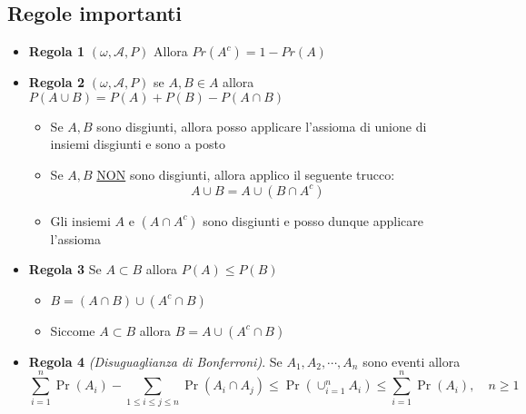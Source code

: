 \subsection{Regole importanti}
\begin{itemize}
	\item  \textbf{Regola 1} $ \left(\omega , \mathcal{A}, P\right) $ Allora $ Pr\left(A^{c}\right) = 1-Pr\left(A\right) $
	\item \textbf{Regola 2} $ \left(\omega , \mathcal{A}, P\right) $ se $ A, B \in A $ allora $ P\left(A \cup B\right) = P\left(A\right) + P\left(B\right) - P\left(A \cap B\right) $
	      \begin{itemize}
		      \item Se $ A, B $ sono disgiunti, allora posso applicare l'assioma di unione di insiemi disgiunti e sono a posto
		      \item Se $ A,B $ \underline{NON} sono disgiunti, allora applico il seguente trucco:
		            \[
			            A \cup B = A \cup\left(B \cap A^{c}\right)
		            \]
		      \item Gli insiemi $ A $ e $ \left(A \cap A^{c}\right) $ sono disgiunti e posso dunque applicare l'assioma
	      \end{itemize}
	\item \textbf{Regola 3} Se $ A \subset B $ allora $ P\left(A\right) \le P\left(B\right) $
	      \begin{itemize}
		      \item $ B = \left(A \cap B\right) \cup \left(A^{c}\cap B\right) $
		      \item Siccome $ A \subset B $ allora $ B= A \cup\left(A^{c}\cap B\right) $
	      \end{itemize}
	\item \textbf{Regola 4} \textit{(Disuguaglianza di Bonferroni)}. Se $A_1, A_2, \cdots, A_n$ sono eventi allora
	      \[
		      \sum_{i=1}^n \Pr\left(A_i\right)-\sum_{1 \leq i \leq j \leq n} \Pr\left(A_i \cap A_j\right) \leq \Pr\left(\cup_{i=1}^n A_i\right) \leq \sum_{i=1}^n \Pr\left(A_i\right), \quad n \geq 1
	      \]
\end{itemize}
